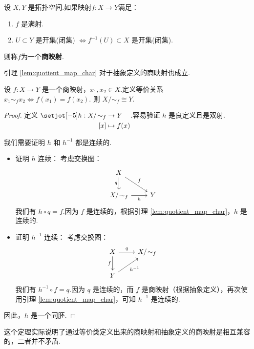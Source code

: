 \begin{definition}[商映射的抽象定义]
    设 $X, Y$ 是拓扑空间.如果映射$f: X \to Y$满足：
    \begin{enumerate}[(1)]
        \item $f$ 是满射.
        \item $U \subset Y$ 是开集(闭集) $\iff f^{-1}(U) \subset X$ 是开集(闭集).
    \end{enumerate}
    则称$f$为一个\textbf{商映射}.
\end{definition}

\begin{remark}
    引理 \ref{lem:quotient_map_char} 对于抽象定义的商映射也成立.
\end{remark}

\begin{theorem}[商空间同胚定理]
    设 $f: X \to Y$ 是一个商映射，$x_1, x_2 \in X$.定义等价关系 $x_1 \sim_f x_2 \iff f(x_1) = f(x_2)$.
    则 $X/\!\sim_f \cong Y$.
\end{theorem}
\begin{proof}
    定义 $\setjot[-5]\begin{aligned}[t]
        h: X/\!\sim_f&\to Y \\
        [x]&\mapsto f(x)
    \end{aligned} $.容易验证 $h$ 是良定义且是双射.\par
    我们需要证明 $h$ 和 $h^{-1}$ 都是连续的.
    \begin{itemize}
        \item 证明 $h$ 连续：
        考虑交换图：
        \[
        \begin{tikzcd}
            X \arrow[rd, "f"] \arrow[d, "q"'] & \\
            X/\!\sim_f \arrow[r, "h"'] & Y
        \end{tikzcd}
        \]
        我们有 $h \circ q = f$.因为 $f$ 是连续的，根据引理 \ref{lem:quotient_map_char}，$h$ 是连续的.

        \item 证明 $h^{-1}$ 连续：
        考虑交换图：
        \[
        \begin{tikzcd}
            X \arrow[d, "f"'] \arrow[r, "q"] & X/\!\sim_f \\
            Y \arrow[ru, "h^{-1}"'] &
        \end{tikzcd}
        \]
        我们有 $h^{-1} \circ f = q$.因为 $q$ 是连续的，而 $f$ 是商映射（根据抽象定义），再次使用引理 \ref{lem:quotient_map_char}，可知 $h^{-1}$ 是连续的.
    \end{itemize}
    因此，$h$ 是一个同胚.
\end{proof}
这个定理实际说明了通过等价类定义出来的商映射和抽象定义的商映射是相互兼容的，二者并不矛盾.

